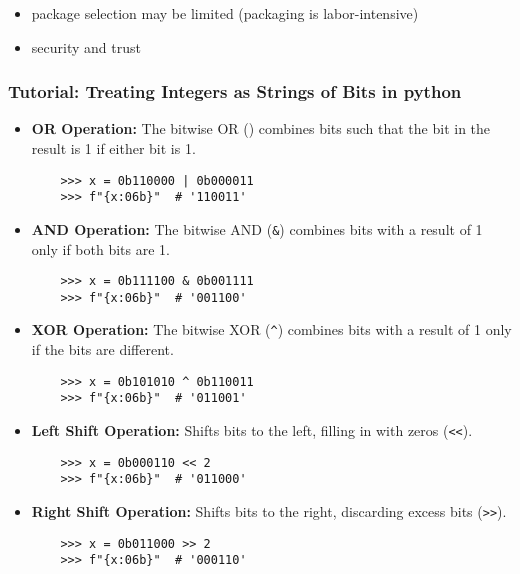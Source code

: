 \documentclass[12pt]{article}
\begin{document}
\begin{itemize}
  \item package selection may be limited (packaging is labor-intensive)
  \item security and trust
\end{itemize}


\subsubsection{Tutorial: Treating Integers as Strings of Bits in python}
\begin{itemize}
    \item \textbf{OR Operation:} The bitwise OR (\texttt{\textbar}) combines bits such that the bit in the result is 1 if either bit is 1.
    \begin{verbatim}
    >>> x = 0b110000 | 0b000011
    >>> f"{x:06b}"  # '110011'
    \end{verbatim}

    \item \textbf{AND Operation:} The bitwise AND (\texttt{\&}) combines bits with a result of 1 only if both bits are 1.
    \begin{verbatim}
    >>> x = 0b111100 & 0b001111
    >>> f"{x:06b}"  # '001100'
    \end{verbatim}

    \item \textbf{XOR Operation:} The bitwise XOR (\texttt{\textasciicircum}) combines bits with a result of 1 only if the bits are different.
    \begin{verbatim}
    >>> x = 0b101010 ^ 0b110011
    >>> f"{x:06b}"  # '011001'
    \end{verbatim}

    \item \textbf{Left Shift Operation:} Shifts bits to the left, filling in with zeros (\texttt{<<}).
    \begin{verbatim}
    >>> x = 0b000110 << 2
    >>> f"{x:06b}"  # '011000'
    \end{verbatim}

    \item \textbf{Right Shift Operation:} Shifts bits to the right, discarding excess bits (\texttt{>>}).
    \begin{verbatim}
    >>> x = 0b011000 >> 2
    >>> f"{x:06b}"  # '000110'
    \end{verbatim}
\end{itemize}
\end{document}
